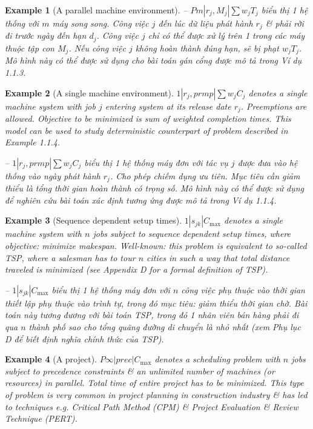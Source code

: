 \documentclass{article}
\newtheorem{example}{Example}
\begin{document}
\begin{itemize}
\begin{itemize}
\begin{example}[A parallel machine environment]
            -- $Pm|r_j,M_j|\sum w_jT_j$ biểu thị 1 hệ thống với $m$ máy song song. Công việc $j$ đến lúc dữ liệu phát hành $r_j$ \& phải rời đi trước ngày đến hạn $d_j$. Công việc $j$ chỉ có thể được xử lý trên 1 trong các máy thuộc tập con $M_j$. Nếu công việc $j$ không hoàn thành đúng hạn, sẽ bị phạt $w_jT_j$. Mô hình này có thể được sử dụng cho bài toán gán cổng được mô tả trong Ví dụ 1.1.3.
        \end{example}

        \begin{example}[A single machine environment]
            $1|r_j,prmp|\sum w_jC_j$ denotes a single machine system with job $j$ entering system at its release date $r_j$. Preemptions are allowed. Objective to be minimized is sum of weighted completion times. This model can be used to study deterministic counterpart of problem described in Example 1.1.4.

            -- $1|r_j,prmp|\sum w_jC_j$ biểu thị 1 hệ thống máy đơn với tác vụ $j$ được đưa vào hệ thống vào ngày phát hành $r_j$. Cho phép chiếm dụng ưu tiên. Mục tiêu cần giảm thiểu là tổng thời gian hoàn thành có trọng số. Mô hình này có thể được sử dụng để nghiên cứu bài toán xác định tương ứng được mô tả trong Ví dụ 1.1.4.
        \end{example}

        \begin{example}[Sequence dependent setup times]
            $1|s_{jk}|C_{\max}$ denotes a single machine system with $n$ jobs subject to sequence dependent setup times, where objective: minimize makespan. Well-known: this problem is equivalent to so-called TSP, where a salesman has to tour $n$ cities in such a way that total distance traveled is minimized (see Appendix D for a formal definition of TSP).

            -- $1|s_{jk}|C_{\max}$ biểu thị 1 hệ thống máy đơn với $n$ công việc phụ thuộc vào thời gian thiết lập phụ thuộc vào trình tự, trong đó mục tiêu: giảm thiểu thời gian chờ. Bài toán này tương đương với bài toán TSP, trong đó 1 nhân viên bán hàng phải đi qua $n$ thành phố sao cho tổng quãng đường di chuyển là nhỏ nhất (xem Phụ lục D để biết định nghĩa chính thức của TSP).
        \end{example}

        \begin{example}[A project]
            $P\infty|prec|C_{\max}$ denotes a scheduling problem with $n$ jobs subject to precedence constraints \& an unlimited number of machines (or resources) in parallel. Total time of entire project has to be minimized. This type of problem is very common in project planning in construction industry \& has led to techniques e.g. Critical Path Method (CPM) \& Project Evaluation \& Review Technique (PERT).


\end{example}
\end{itemize}
\end{itemize}
\end{document}
